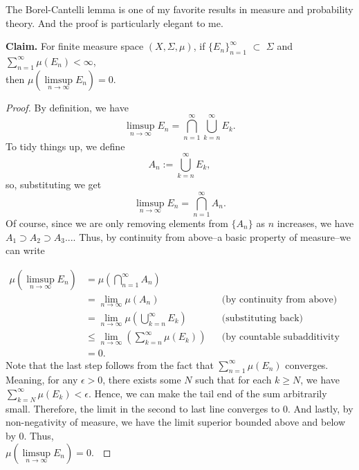 \documentclass{article}
\begin{document}
The Borel-Cantelli lemma is one of my favorite results in measure and probability theory. And the proof is particularly elegant to me. 

\textbf{Claim.} For finite measure space $(X, \Sigma, \mu)$, if $\{E_n\}_{n=1}^{\infty}$ $\subset$ $\Sigma$ and 
$\sum\limits_{n=1}^{\infty} \mu(E_n) < \infty$, \\ then $\mu(\limsup\limits_{n\rightarrow\infty} E_n) = 0$.

\begin{proof}
By definition, we have $$\limsup\limits_{n\rightarrow\infty} E_n = \bigcap\limits_{n=1}^{\infty} \bigcup\limits_{k=n}^{\infty} E_k.$$
To tidy things up, we define $$ A_n := \bigcup\limits_{k = n}^{\infty} E_k,$$ so, substituting we get 
$$\limsup\limits_{n\rightarrow\infty} E_n = \bigcap\limits_{n=1}^{\infty} A_n.$$ 
Of course, since we are only removing elements from $\{A_n\}$ as $n$ increases, we have
$A_1 \supset A_2 \supset A_3 ... $. Thus, by continuity from above--a basic property of measure--we can write 

\begin{align*}
    \mu(\limsup\limits_{n\rightarrow\infty} E_n) &= \mu(\bigcap\limits_{n=1}^{\infty} A_n) \\
    &= \lim_{n\rightarrow\infty} \mu(A_n) &&\text{(by continuity from above)}\\
    &= \lim_{n\rightarrow\infty} \mu(\bigcup\limits_{k = n}^{\infty} E_k) &&\text{(substituting back)} \\ 
    &\leq \lim_{n\rightarrow\infty}(\sum\limits_{k = n}^{\infty} \mu(E_k)) &&\text{(by countable subadditivity property of measure)} \\
    &= 0.
\end{align*}
Note that the last step follows from the fact that $\sum\limits_{n=1}^{\infty} \mu(E_n)$ converges. Meaning, for any $\epsilon > 0$, 
there exists some $N$ such that for each $k \geq N$, we have $\sum\limits_{k = N}^{\infty} \mu(E_k) < \epsilon$. 
Hence, we can make the tail end of the sum arbitrarily small. Therefore, the limit in the second to last line converges to 0. 
And lastly, by non-negativity of measure, we have the limit superior bounded above and below by 0. Thus, \\
$\mu(\limsup\limits_{n\rightarrow\infty} E_n) = 0$. $\qedhere$
\end{proof}
\end{document}
